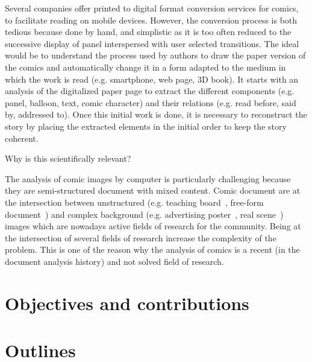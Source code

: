 Several companies offer printed to digital format conversion services for comics, to facilitate reading on mobile devices.
However, the conversion process is both tedious because done by hand, and simplistic as it is too often reduced to the successive display of panel interspersed with user selected transitions.
The ideal would be to understand the process used by authors to draw the paper version of the comics and automatically change it in a form adapted to the medium in which the work is read (e.g. smartphone, web page, 3D book). 
It starts with an analysis of  the digitalized paper page to extract the different components (e.g. panel, balloon, text, comic character) and their relations (e.g. read before, said by, addressed to).
Once this initial work is done, it is necessary to reconstruct the story by placing the extracted elements in the initial order to keep the story coherent.



Why is this scientifically relevant?

The analysis of comic images by computer is particularly challenging because they are semi-structured document with mixed content.
Comic document are at the intersection between unstructured (e.g. teaching board~\cite{Oliveira10}, free-form document~\cite{Delaye2014Multi}) and complex background (e.g. advertising poster~\cite{Clavelli09}, real scene~\cite{Weinman09,Epshtein10,Neumann12}) images which are nowadays active fields of research for the community.
Being at the intersection of several fields of research increase the complexity of the problem.
This is one of the reason why the analysis of comics is a recent (in the document analysis history) and not solved field of research.



\section{Objectives and contributions}


\section{Outlines}
